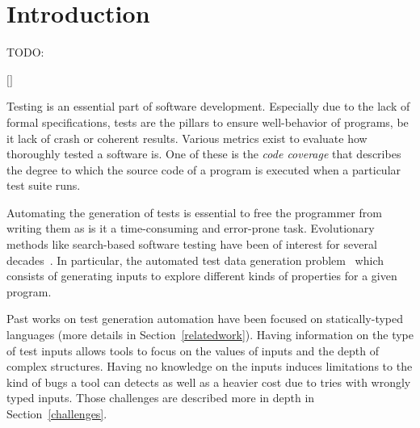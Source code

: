 \documentclass{llncs2e/llncs}
\def\todo#1{{\color{red}TODO:\quad#1}}
\def\addref#1{{\color{red}$[$#1$]$}}
\begin{document}
\vfill

\begin{abstract}
  \todo{}
Despite popular usage, most of the dynamically typed languages still lack
automated test data generation tools.  Most of the existing tools and
approaches depend critically on static and explicit types, which makes it hard
to port any of them over to dynamically typed languages. In this paper we
present a search-based test data generation tool, NAME, which focuses on
primitive types and lists of Python. NAME not only searches for test input
values but also for appropriate types for each input argument. We evaluate NAME
based on the structural coverage it achieves, the cost of the type search, and
the overhead for the execution of the function under test. We further discuss
the future of automated testing for dynamic and object-oriented languages based
on our experience.
\end{abstract}
%
\newpage


\section{Introduction}
\todo{}

\addref{}

Testing is an essential part of software development. Especially due to the lack
of formal specifications, tests are the pillars to ensure well-behavior of
programs, be it lack of crash or coherent results. Various metrics exist to
evaluate how thoroughly tested a software is. One of these is the \textit{code
coverage} that describes the degree to which the source code of a program is
executed when a particular test suite runs.

Automating the generation of tests is essential to free the programmer from
writing them as is it a time-consuming and error-prone task. Evolutionary
methods like search-based software testing have been of interest for several
decades~\cite{miller1976automatic}. In particular, the automated test data
generation problem~\cite{korel1990automated} which consists of generating inputs
to explore different kinds of properties for a given program.

Past works on test generation automation have been focused on statically-typed
languages (more details in Section~\ref{relatedwork}). Having information on the
type of test inputs allows tools to focus on the values of inputs and the depth
of complex structures. Having no knowledge on the inputs induces limitations to
the kind of bugs a tool can detects as well as a heavier cost due to tries with
wrongly typed inputs. Those challenges are described more in depth in
Section~\ref{challenges}.
\end{document}
